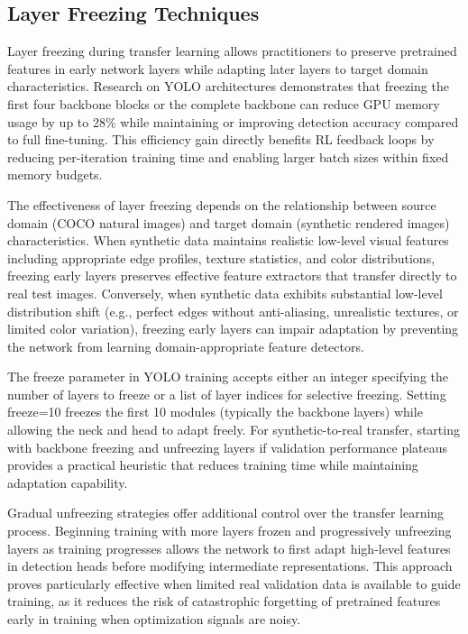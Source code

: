 \subsection{Layer Freezing Techniques}

Layer freezing during transfer learning allows practitioners to preserve pretrained features in early network layers while adapting later layers to target domain characteristics. Research on YOLO architectures demonstrates that freezing the first four backbone blocks or the complete backbone can reduce GPU memory usage by up to 28\% while maintaining or improving detection accuracy compared to full fine-tuning. This efficiency gain directly benefits RL feedback loops by reducing per-iteration training time and enabling larger batch sizes within fixed memory budgets.

The effectiveness of layer freezing depends on the relationship between source domain (COCO natural images) and target domain (synthetic rendered images) characteristics. When synthetic data maintains realistic low-level visual features including appropriate edge profiles, texture statistics, and color distributions, freezing early layers preserves effective feature extractors that transfer directly to real test images. Conversely, when synthetic data exhibits substantial low-level distribution shift (e.g., perfect edges without anti-aliasing, unrealistic textures, or limited color variation), freezing early layers can impair adaptation by preventing the network from learning domain-appropriate feature detectors.

The freeze parameter in YOLO training accepts either an integer specifying the number of layers to freeze or a list of layer indices for selective freezing. Setting freeze=10 freezes the first 10 modules (typically the backbone layers) while allowing the neck and head to adapt freely. For synthetic-to-real transfer, starting with backbone freezing and unfreezing layers if validation performance plateaus provides a practical heuristic that reduces training time while maintaining adaptation capability.

Gradual unfreezing strategies offer additional control over the transfer learning process. Beginning training with more layers frozen and progressively unfreezing layers as training progresses allows the network to first adapt high-level features in detection heads before modifying intermediate representations. This approach proves particularly effective when limited real validation data is available to guide training, as it reduces the risk of catastrophic forgetting of pretrained features early in training when optimization signals are noisy.

